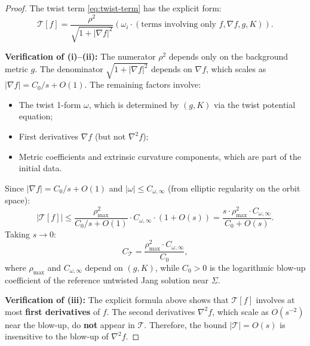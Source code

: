 \begin{proof}
The twist term \eqref{eq:twist-term} has the explicit form:
\[
\mathcal{T}[f] = \frac{\rho^2}{\sqrt{1 + |\nabla f|^2}} \left( \omega_i \cdot (\text{terms involving only } f, \nabla f, g, K) \right).
\]

\textbf{Verification of (i)--(ii):} The numerator $\rho^2$ depends only on the background metric $g$. The denominator $\sqrt{1 + |\nabla f|^2}$ depends on $\nabla f$, which scales as $|\nabla f| = C_0/s + O(1)$. The remaining factors involve:
\begin{itemize}
    \item The twist 1-form $\omega$, which is determined by $(g, K)$ via the twist potential equation;
    \item First derivatives $\nabla f$ (but not $\nabla^2 f$);
    \item Metric coefficients and extrinsic curvature components, which are part of the initial data.
\end{itemize}

Since $|\nabla f| = C_0/s + O(1)$ and $|\omega| \leq C_{\omega,\infty}$ (from elliptic regularity on the orbit space):
\[
|\mathcal{T}[f]| \leq \frac{\rho_{\max}^2}{C_0/s + O(1)} \cdot C_{\omega,\infty} \cdot (1 + O(s)) = \frac{s \cdot \rho_{\max}^2 \cdot C_{\omega,\infty}}{C_0 + O(s)}.
\]
Taking $s \to 0$:
\[
C_\mathcal{T} = \frac{\rho_{\max}^2 \cdot C_{\omega,\infty}}{C_0},
\]
where $\rho_{\max}$ and $C_{\omega,\infty}$ depend on $(g, K)$, while $C_0>0$ is the logarithmic blow-up coefficient of the reference untwisted Jang solution near $\Sigma$.

\textbf{Verification of (iii):} The explicit formula above shows that $\mathcal{T}[f]$ involves at most \textbf{first derivatives} of $f$. The second derivatives $\nabla^2 f$, which scale as $O(s^{-2})$ near the blow-up, do \textbf{not} appear in $\mathcal{T}$. Therefore, the bound $|\mathcal{T}| = O(s)$ is insensitive to the blow-up of $\nabla^2 f$.
\end{proof}

